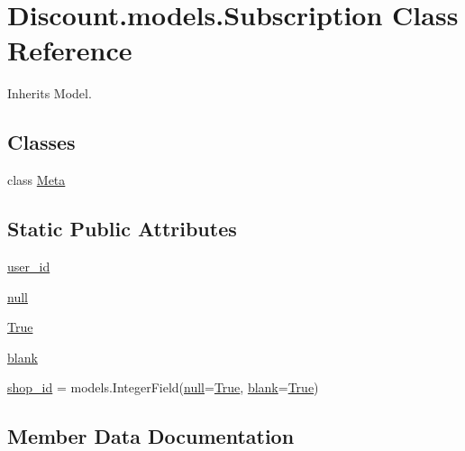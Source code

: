 \hypertarget{class_discount_1_1models_1_1_subscription}{}\section{Discount.\+models.\+Subscription Class Reference}
\label{class_discount_1_1models_1_1_subscription}


Inherits Model.

\subsection*{Classes}
\begin{DoxyCompactItemize}
\item 
class \hyperlink{class_discount_1_1models_1_1_subscription_1_1_meta}{Meta}
\end{DoxyCompactItemize}
\subsection*{Static Public Attributes}
\begin{DoxyCompactItemize}
\item 
\hyperlink{class_discount_1_1models_1_1_subscription_acdb9b08de4ae7421070ac6e41dd73fa8}{user\+\_\+id}
\item 
\hyperlink{class_discount_1_1models_1_1_subscription_a0cd72c46ae1fc7a0da3a2b7d6b6e074e}{null}
\item 
\hyperlink{class_discount_1_1models_1_1_subscription_aaea85baa14dbf9409eb65ab9ee7a3cda}{True}
\item 
\hyperlink{class_discount_1_1models_1_1_subscription_a9c1c72a28a9411be3d203c839d67b1af}{blank}
\item 
\hyperlink{class_discount_1_1models_1_1_subscription_a06d4554418d95d199818a210ed694c3c}{shop\+\_\+id} = models.\+Integer\+Field(\hyperlink{class_discount_1_1models_1_1_subscription_a0cd72c46ae1fc7a0da3a2b7d6b6e074e}{null}=\hyperlink{class_discount_1_1models_1_1_subscription_aaea85baa14dbf9409eb65ab9ee7a3cda}{True}, \hyperlink{class_discount_1_1models_1_1_subscription_a9c1c72a28a9411be3d203c839d67b1af}{blank}=\hyperlink{class_discount_1_1models_1_1_subscription_aaea85baa14dbf9409eb65ab9ee7a3cda}{True})
\end{DoxyCompactItemize}


\subsection{Member Data Documentation}
\mbox{\label{class_discount_1_1models_1_1_subscription_a9c1c72a28a9411be3d203c839d67b1af}} 
